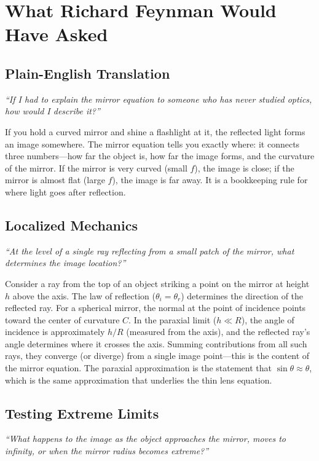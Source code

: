 \section*{What Richard Feynman Would Have Asked}

\subsection*{Plain-English Translation}
\textit{``If I had to explain the mirror equation to someone who has never studied optics, how would I describe it?''}

If you hold a curved mirror and shine a flashlight at it, the reflected light forms an image somewhere. The mirror equation tells you exactly where: it connects three numbers---how far the object is, how far the image forms, and the curvature of the mirror. If the mirror is very curved (small $f$), the image is close; if the mirror is almost flat (large $f$), the image is far away. It is a bookkeeping rule for where light goes after reflection.

\subsection*{Localized Mechanics}
\textit{``At the level of a single ray reflecting from a small patch of the mirror, what determines the image location?''}

Consider a ray from the top of an object striking a point on the mirror at height $h$ above the axis. The law of reflection ($\theta_{i} = \theta_{r}$) determines the direction of the reflected ray. For a spherical mirror, the normal at the point of incidence points toward the center of curvature $C$. In the paraxial limit ($h \ll R$), the angle of incidence is approximately $h/R$ (measured from the axis), and the reflected ray's angle determines where it crosses the axis. Summing contributions from all such rays, they converge (or diverge) from a single image point---this is the content of the mirror equation. The paraxial approximation is the statement that $\sin\theta \approx \theta$, which is the same approximation that underlies the thin lens equation.

\subsection*{Testing Extreme Limits}
\textit{``What happens to the image as the object approaches the mirror, moves to infinity, or when the mirror radius becomes extreme?''}


